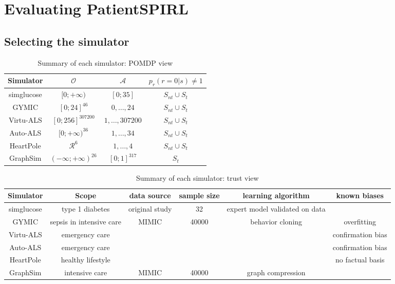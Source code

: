 \chapter{Evaluating PatientSPIRL}
\label{ch:eval}

\section{Selecting the simulator}

\begin{table}[]
    \centering
    \begin{tabular}{c|c|c|c}
         Simulator & $\mathcal{O} $ & $\mathcal{A}$ & $p_r(r=0|s) \neq 1$ \\
         \midrule
         simglucose & $[0;+\infty)$ & $[0;35]$ & $S_{nt} \cup S_t$ \\
         GYMIC & $[0;24]^{46}$ & $0,\dots,24$ & $S_{nt} \cup S_t$ \\
         Virtu-ALS & $[0;256]^{307200}$ & $1,\dots,307200$ & $S_{nt} \cup S_t$ \\
         Auto-ALS & $[0;+\infty)^{36}$ & $1,\dots,34$ & $S_{nt} \cup S_t$ \\
         HeartPole & $\mathcal{R}^6$ & $1,\dots,4$ & $S_{nt} \cup S_t$ \\
         GraphSim & $(-\infty;+\infty)^{26}$ & $[0;1]^{317}$ & $S_t$ \\
    \end{tabular}
    \caption{Summary of each simulator: POMDP view}
    \label{tab:structview}
\end{table}

\begin{table*}[]
    \centering
    \begin{tabular}{c|c|c|c|c|c}
         Simulator & Scope & data source & sample size & learning algorithm & known biases \\
         \midrule
         simglucose \cite{simglucose} & type 1 diabetes & original study & 32 & expert model validated on data & \\
         GYMIC \cite{gymic} & sepsis in intensive care & MIMIC \cite{mimic} & 40000 & behavior cloning & overfitting \\
         Virtu-ALS \cite{briskAIEnhanceInteractive2018} & emergency care & & & & confirmation bias \\
         Auto-ALS & emergency care & & & & confirmation bias \\
         HeartPole & healthy lifestyle & & & & no factual basis \\
         GraphSim & intensive care & MIMIC \cite{mimic} & 40000 & graph compression & \\
    \end{tabular}
    \caption{Summary of each simulator: trust view}
    \label{tab:trustview}
\end{table*}

